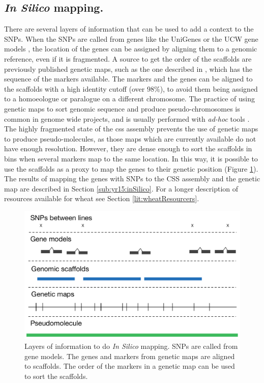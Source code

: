\subsection{\textit{In Silico} mapping.}
There are several layers of information that can be used to add a context to the SNPs. 
When the SNPs are called from genes like the UniGenes \citep{PontiusJUWagnerL2002} or the UCW gene models \citep{Krasileva2013}, the location of the genes can be assigned by aligning them to a genomic reference, even if it is fragmented. 
A source to get the order of the scaffolds are previously published genetic maps, such as the one described in \citet{Wang2014}, which has the sequence of the markers available.
The markers and the genes can be aligned to the scaffolds with a high identity cutoff (over $98\%$), to avoid them being assigned to a homoeologue or paralogue on a different chromosome.
The practice of using genetic maps to sort genomic sequence and produce pseudo-chromosomes is common in genome wide projects, and is usually performed with \textit{ad-hoc} tools \citep{Tang2015}.
The highly fragmented state of the \acrshort{css} assembly prevents the use of genetic maps to produce pseudo-molecules, as those maps which are currently available do not have enough resolution.
However, they are dense enough to sort the scaffolds in bins when several markers map to the same location. 
In this way, it is possible to use the scaffolds as a proxy to map the genes to their genetic position (Figure \ref{fig:yr15:layersOfMapping}).
The results of mapping the genes with SNPs to the CSS assembly and the genetic map are described in Section \ref{sub:yr15:inSilico}. 
For a longer description of resources available for wheat see Section \ref{lit:wheatResourcers}.

\begin{figure}
  \centering
  \includegraphics[width=1\textwidth]{Yr15/Figures/mapping/layersOfMapping.pdf}
  \caption[Layers of information to do \textit{In Silico} mapping.]{Layers of information to do \textit{In Silico} mapping. SNPs are called from gene models. The genes and markers from genetic maps are aligned to scaffolds. The order of the markers in a genetic map can be used to sort the scaffolds.} 
  \label{fig:yr15:layersOfMapping}
\end{figure}

